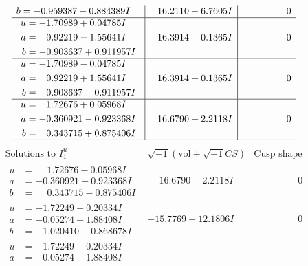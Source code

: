 \documentclass[1p]{elsarticle_modified}
\theoremstyle{definition}
\newcommand{\I}{\sqrt{-1}}
\begin{document}
$$\begin{array}{c|c|c}
\begin{aligned}
b &= -0.959387 - 0.884389 I\end{aligned}
 & \phantom{-}16.2110 - 6.7605 I & \phantom{-0.000000 } 0 \\ \hline\begin{aligned}
u &= -1.70989 + 0.04785 I \\
a &= \phantom{-}0.92219 - 1.55641 I \\
b &= -0.903637 + 0.911957 I\end{aligned}
 & \phantom{-}16.3914 - 0.1365 I & \phantom{-0.000000 } 0 \\ \hline\begin{aligned}
u &= -1.70989 - 0.04785 I \\
a &= \phantom{-}0.92219 + 1.55641 I \\
b &= -0.903637 - 0.911957 I\end{aligned}
 & \phantom{-}16.3914 + 0.1365 I & \phantom{-0.000000 } 0 \\ \hline\begin{aligned}
u &= \phantom{-}1.72676 + 0.05968 I \\
a &= -0.360921 - 0.923368 I \\
b &= \phantom{-}0.343715 + 0.875406 I\end{aligned}
 & \phantom{-}16.6790 + 2.2118 I & \phantom{-0.000000 } 0\\
 \hline 
 \end{array}$$\newpage$$\begin{array}{c|c|c}  
\text{Solutions to }I^u_{1}& \I (\text{vol} + \sqrt{-1}CS) & \text{Cusp shape}\\
 \hline 
\begin{aligned}
u &= \phantom{-}1.72676 - 0.05968 I \\
a &= -0.360921 + 0.923368 I \\
b &= \phantom{-}0.343715 - 0.875406 I\end{aligned}
 & \phantom{-}16.6790 - 2.2118 I & \phantom{-0.000000 } 0 \\ \hline\begin{aligned}
u &= -1.72249 + 0.20334 I \\
a &= -0.05274 + 1.88408 I \\
b &= -1.020410 - 0.868678 I\end{aligned}
 & -15.7769 - 12.1806 I & \phantom{-0.000000 } 0 \\ \hline\begin{aligned}
u &= -1.72249 - 0.20334 I \\
a &= -0.05274 - 1.88408 I \\

\end{aligned}
\end{array}$$
\end{document}
